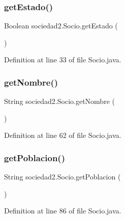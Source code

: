 \subsubsection{\texorpdfstring{get\+Estado()}{getEstado()}}
{\footnotesize\ttfamily Boolean sociedad2.\+Socio.\+get\+Estado (\begin{DoxyParamCaption}{ }\end{DoxyParamCaption})}



Definition at line 33 of file Socio.\+java.

\mbox{\label{classsociedad2_1_1_socio_ae934c6a307188c82c399735a42982579}} 
\subsubsection{\texorpdfstring{get\+Nombre()}{getNombre()}}
{\footnotesize\ttfamily String sociedad2.\+Socio.\+get\+Nombre (\begin{DoxyParamCaption}{ }\end{DoxyParamCaption})}



Definition at line 62 of file Socio.\+java.

\mbox{\label{classsociedad2_1_1_socio_ac3e736fa7d2c1e66bae1cfac3645b15d}} 
\subsubsection{\texorpdfstring{get\+Poblacion()}{getPoblacion()}}
{\footnotesize\ttfamily String sociedad2.\+Socio.\+get\+Poblacion (\begin{DoxyParamCaption}{ }\end{DoxyParamCaption})}



Definition at line 86 of file Socio.\+java.

\mbox{\label{classsociedad2_1_1_socio_a1671fd7961025e6b3ea7e49506bbeb9e}} 
